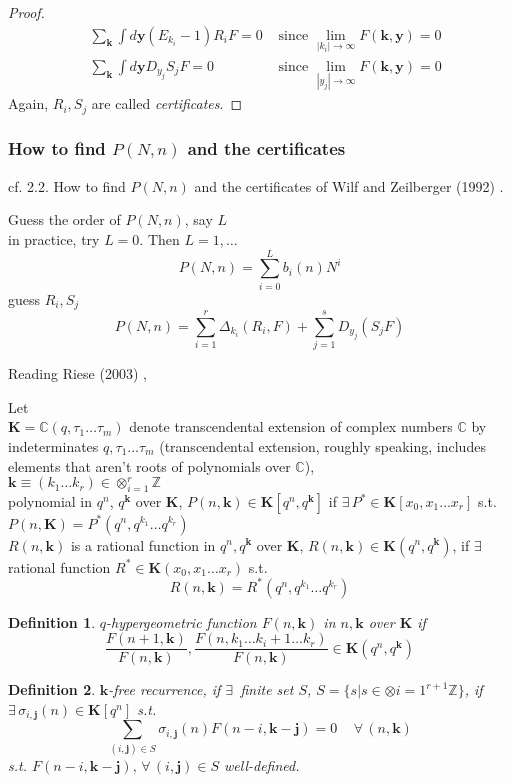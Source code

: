 \documentclass[10pt]{amsart}
\newtheorem{definition}{Definition}
\begin{document}
\begin{multicols*}{2}
\begin{proof}
  \[
\begin{aligned}
  & \sum_{\mathbf{k}} \int d\mathbf{y} (E_{k_i} - 1) R_iF = 0 & \text{ since } \lim_{ |k_i|\to \infty} F(\mathbf{k},\mathbf{y})=0 \\ 
  & \sum_{\mathbf{k}} \int d\mathbf{y} D_{y_j}S_jF = 0 & \text{ since } \lim_{ |y_j|\to \infty} F(\mathbf{k},\mathbf{y})=0 
\end{aligned}
\]
Again, $R_i,S_j$ are called \emph{certificates}.
\end{proof}

\subsubsection{How to find $P(N,n)$ and the certificates}

cf. 2.2. How to find $P(N,n)$ and the certificates of Wilf and Zeilberger (1992) \cite{HWilfDZeilberger1992}.  

Guess the order of $P(N,n)$, say $L$ \\
\phantom{Guess } in practice, try $L =0$.  Then $L=1, \dots $
\[
P(N,n) = \sum_{i=0}^L b_i(n)N^i
\]
guess $R_i,S_j$
\[
P(N,n) = \sum_{i=1}^r \Delta_{k_i}(R_i,F)  + \sum_{j=1}^s D_{y_j}(S_jF)
\]

Reading Riese (2003) \cite{ARiese2003},

Let \\
$\mathbf{K} = \mathbb{C}(q,\tau_1 \dots \tau_m)$ denote transcendental extension of complex numbers $\mathbb{C}$ by indeterminates $q,\tau_1 \dots \tau_m$ (transcendental extension, roughly speaking, includes elements that aren't roots of polynomials over $\mathbb{C}$), \\
$\mathbf{k} \equiv (k_1 \dots k_r) \in \otimes_{i=1}^r\mathbb{Z}$ \\
polynomial in $q^n$, $q^{\mathbf{k}}$ over $\mathbf{K}$, $P(n,\mathbf{k}) \in \mathbf{K}[q^n,q^{\mathbf{k}}]$ if $\exists \, P^* \in \mathbf{K}[x_0,x_1\dots x_r]$ s.t. $P(n,\mathbf{K}) = P^*(q^n,q^{k_1} \dots q^{k_r})$ \\
$R(n,\mathbf{k})$ is a rational function in $q^n, q^{\mathbf{k}}$ over $\mathbf{K}$, $R(n,\mathbf{k}) \in \mathbf{K}(q^n,q^{\mathbf{k}})$, if $\exists \, $ rational function $R^* \in \mathbf{K}(x_0,x_1 \dots x_r)$ s.t. 
\[
R(n,\mathbf{k}) = R^*(q^n,q^{k_1} \dots q^{k_r})
\]
\begin{definition}
  $q$-hypergeometric function $F(n,\mathbf{k})$ in $n,\mathbf{k}$ over $\mathbf{K}$ if 
\[
\frac{F(n+1,\mathbf{k})}{F(n,\mathbf{k})} , \frac{F(n,k_1 \dots k_i+1 \dots k_r)}{F(n,\mathbf{k})} \in \mathbf{K}(q^n,q^{\mathbf{k}})
\]
\end{definition}
\begin{definition}
  $\mathbf{k}$-free recurrence, if $\exists \,$ finite set $S$, $S = \lbrace s | s \in \otimes{i=1}^{r+1} \mathbb{Z} \rbrace$, if $\exists \, \sigma_{i,\mathbf{j}}(n) \in \mathbf{K}[q^n]$ s.t.
\[
\sum_{(i,\mathbf{j}) \in S} \sigma_{i,\mathbf{j}}(n)F(n-i,\mathbf{k}-\mathbf{j})=0 \quad \, \forall \, (n,\mathbf{k})
\]
s.t. $F(n-i,\mathbf{k}-\mathbf{j}) , \, \forall \, (i,\mathbf{j}) \in S$ well-defined.


\end{definition}
\end{multicols*}
\end{document}
